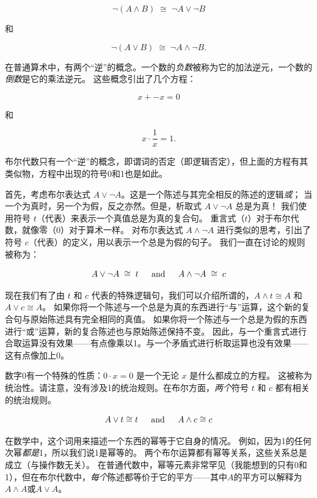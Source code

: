 \[ {\lnot}(A \land B) \; \cong \; {\lnot}A \lor {\lnot}B \]

\noindent 和

\[ {\lnot}(A \lor B) \; \cong \; {\lnot}A \land {\lnot}B. \]

在普通算术中，有两个“逆”的概念。一个数的{\em 负数}被称为它的加法逆元，一个数的{\em 倒数}是它的乘法逆元。
这些概念引出了几个方程：

\[ x + -x = 0 \]

\noindent 和

\[ x \cdot \frac{1}{x} = 1. \]

\noindent 布尔代数只有一个“逆”的概念，即谓词的否定（即逻辑否定），但上面的方程有其类似物，方程中出现的符号0和1也是如此。

首先，考虑布尔表达式 $A \lor {\lnot}A$。这是一个陈述与其完全相反的陈述的逻辑{\em 或}；
当一个为真时，另一个为假，反之亦然。但是，析取式 $A \lor {\lnot}A$ 总是为真！
我们使用符号 $t$（代表）来表示一个真值总是为真的复合句。
重言式（$t$）对于布尔代数，就像零（$0$）对于算术一样。
对布尔表达式 $A \land {\lnot}A$ 进行类似的思考，引出了符号 $c$（代表）的定义，用以表示一个总是为假的句子。
我们一直在讨论的规则被称为：

\[ A \lor {\lnot}A \; \cong \; t \mbox{\rule{12pt}{0pt} and \rule{12pt}{0pt}}
A \land {\lnot}A \; \cong \; c \]

现在我们有了由 $t$ 和 $c$ 代表的特殊逻辑句，我们可以介绍所谓的，$A \land t \cong A$ 和 $A \lor c \cong A$。
如果你将一个陈述与一个总是为真的东西进行“与”运算，这个新的复合句与原始陈述具有完全相同的真值。
如果你将一个陈述与一个总是为假的东西进行“或”运算，新的复合陈述也与原始陈述保持不变。
因此，与一个重言式进行合取运算没有效果——有点像乘以1。与一个矛盾式进行析取运算也没有效果——这有点像加上0。

数字0有一个特殊的性质：$0 \cdot x = 0$ 是一个无论 $x$ 是什么都成立的方程。
这被称为统治性。请注意，没有涉及1的统治规则。在布尔方面，{\em 两个}符号 $t$ 和 $c$ 都有相关的统治规则。

\[ A \lor t \cong t \mbox{\rule{12pt}{0pt} and \rule{12pt}{0pt}} 
A \land c \cong c \]

在数学中，这个词用来描述一个东西的幂等于它自身的情况。
例如，因为1的任何次幂{\em 都是}1，所以我们说1是幂等的。
两个布尔运算都有幂等关系，这些关系总是成立（与操作数无关）。
在普通代数中，幂等元素非常罕见（我能想到的只有0和1），但在布尔代数中，{\em 每个}陈述都等价于它的平方——其中$A$的平方可以解释为$A \land A$或$A \lor A$。

